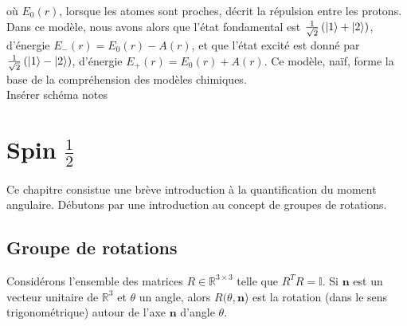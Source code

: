 \documentclass[../notesdecours.tex]{subfiles}
\begin{document}
où $E_0(r)$, lorsque les atomes sont proches, décrit la répulsion entre les protons.\\

Dans ce modèle, nous avons alors que l'état fondamental est $\frac{1}{\sqrt{2}}\left(\ket{1}+\ket{2}\right)$, d'énergie $E_-(r) = E_0(r)-A(r)$, et que l'état excité est donné par $\frac{1}{\sqrt{2}}\left(\ket{1}-\ket{2}\right)$, d'énergie $E_+(r) = E_0(r)+A(r)$. Ce modèle, naïf, forme la base de la compréhension des modèles chimiques.\\

\color{red} Insérer schéma notes \color{black}

\section{Spin $\frac{1}{2}$}
Ce chapitre consistue une brève introduction à la quantification du moment angulaire. Débutons par une introduction au concept de groupes de rotations.

\subsection{Groupe de rotations}

Considérons l'ensemble des matrices $R \in \mathbb{R}^{3\times 3}$ telle que $R^TR = \mathbb{I}$. Si $\bm{n}$ est un vecteur unitaire de $\mathbb{R}^3$ et $\theta$ un angle, alors $R(\theta,\bm{n}$) est la rotation (dans le sens trigonométrique) autour de l'axe $\bm{n}$ d'angle $\theta$.
\end{document}
